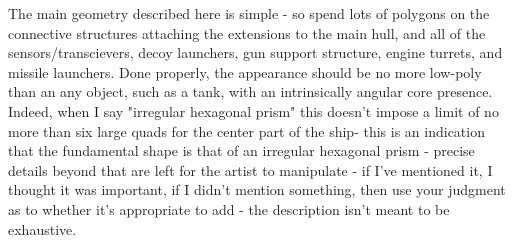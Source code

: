 The main geometry described here is simple - so spend lots of polygons on the connective structures attaching the extensions to the main hull, and all of the sensors/transcievers, decoy launchers, gun support structure, engine turrets, and missile launchers. Done properly, the appearance should be no more low-poly than an any object, such as a tank, with an intrinsically angular core presence. Indeed, when I say "irregular hexagonal prism" this doesn't impose a limit of no more than six large quads for the center part of the ship- this is an indication that the fundamental shape is that of an irregular hexagonal prism - precise details beyond that are left for the artist to manipulate - if I've mentioned it, I thought it was important, if I didn't mention something, then use your judgment as to whether it's appropriate to add - the description isn't meant to be exhaustive.




